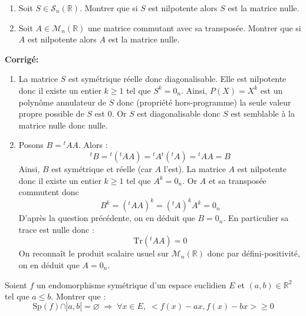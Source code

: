 \documentclass[a4paper,twoside,french,11pt]{VcCours}
\newcommand{\corr}{\textbf{Corrigé:}}
\begin{document}
\begin{Exercice}{}
\begin{enumerate}
\item Soit $S \in \mathcal{S}_n(\mathbb{R})$. Montrer que si $S$ est nilpotente alors $S$ est la matrice nulle.
\item Soit $A \in \mathcal{M}_n(\mathbb{R})$ une matrice commutant avec sa transposée. Montrer que si $A$ est nilpotente alors $A$ est la matrice nulle. 
\end{enumerate}
\end{Exercice}

\corr

\begin{enumerate}
\item La matrice $S$ est symétrique réelle donc diagonalisable. Elle est nilpotente donc il existe un entier $k \geq 1$ tel que $S^k=0_n$. Ainsi, $P(X)=X^k$ est un polynôme annulateur de $S$ donc (propriété hors-programme) la seule valeur propre possible de $S$ est $0$. Or $S$ est diagonalisable donc $S$ est semblable à la matrice nulle donc nulle.
\item Posons $B= {}^t A A$. Alors :
$$ {}^t B = {}^t ({}^t A A) = {}^t A {}^t({}^tA) = {}^tA A = B$$
Ainsi, $B$ est symétrique et réelle (car $A$ l'est). La matrice $A$ est nilpotente donc il existe un entier $k \geq 1$ tel que $A^k=0_n$. Or $A$ et sa transposée commutent donc 
$$ B^k = ({}^t A A)^k = ({}^t A)^k A^k = 0_n$$
D'après la question précédente, on en déduit que $B=0_n$. En particulier sa trace est nulle donc :
$$ \textrm{Tr}({}^t A A) = 0$$
On reconnaît le produit scalaire usuel sur $\mathcal{M}_n(\mathbb{R})$ donc par défini-positivité, on en déduit que $A=0_n$.
\end{enumerate}

\begin{Exercice}{} Soient $f$ un endomorphisme symétrique d'un espace euclidien $E$ et $(a,b) \in \mathbb{R}^2$ tel que $a \leq b$. Montrer que :
$$ \textrm{Sp}(f) \cap ]a,b[ = \varnothing \; \Longrightarrow \; \forall x \in E, \; <f(x)-ax,f(x)-bx> \geq 0$$
\end{Exercice}
\end{document}
